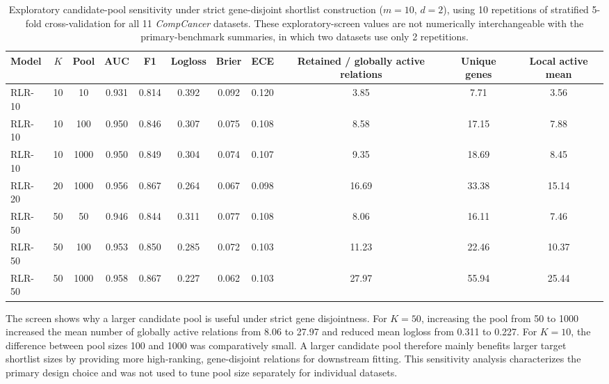 \documentclass[11pt, a4paper]{article}
\begin{document}
\begin{table}[!htbp]
\centering
\caption{Exploratory candidate-pool sensitivity under strict gene-disjoint shortlist construction ($m=10$, $d=2$), using 10 repetitions of stratified 5-fold cross-validation for all 11 \emph{CompCancer} datasets. These exploratory-screen values are not numerically interchangeable with the primary-benchmark summaries, in which two datasets use only 2 repetitions.}
\label{tab:pool_ablation}
{\scriptsize
\setlength{\tabcolsep}{3pt}
\renewcommand{\arraystretch}{1.15}
\begin{adjustbox}{max width=\linewidth}
\begin{tabular}{lcccccccccc}
\toprule
\textbf{Model} &
\textbf{$K$} &
\textbf{Pool} &
\textbf{AUC} &
\textbf{F1} &
\textbf{Logloss} &
\textbf{Brier} &
\textbf{ECE} &
\textbf{Retained / globally active relations} &
\textbf{Unique genes} &
\textbf{Local active mean} \\
\midrule
RLR-10 & 10 & 10   & 0.931 & 0.814 & 0.392 & 0.092 & 0.120 & 3.85  & 7.71  & 3.56 \\
RLR-10 & 10 & 100  & 0.950 & 0.846 & 0.307 & 0.075 & 0.108 & 8.58  & 17.15 & 7.88 \\
RLR-10 & 10 & 1000 & 0.950 & 0.849 & 0.304 & 0.074 & 0.107 & 9.35  & 18.69 & 8.45 \\
\midrule
RLR-20 & 20 & 1000 & 0.956 & 0.867 & 0.264 & 0.067 & 0.098 & 16.69 & 33.38 & 15.14 \\
\midrule
RLR-50 & 50 & 50   & 0.946 & 0.844 & 0.311 & 0.077 & 0.108 & 8.06  & 16.11 & 7.46 \\
RLR-50 & 50 & 100  & 0.953 & 0.850 & 0.285 & 0.072 & 0.103 & 11.23 & 22.46 & 10.37 \\
RLR-50 & 50 & 1000 & 0.958 & 0.867 & 0.227 & 0.062 & 0.103 & 27.97 & 55.94 & 25.44 \\
\bottomrule
\end{tabular}
\end{adjustbox}
}
\end{table}

The screen shows why a larger candidate pool is useful under strict gene disjointness. For $K=50$, increasing the pool from 50 to 1000 increased the mean number of globally active relations from 8.06 to 27.97 and reduced mean logloss from 0.311 to 0.227. For $K=10$, the difference between pool sizes 100 and 1000 was comparatively small. A larger candidate pool therefore mainly benefits larger target shortlist sizes by providing more high-ranking, gene-disjoint relations for downstream fitting. This sensitivity analysis characterizes the primary design choice and was not used to tune pool size separately for individual datasets.
\end{document}
